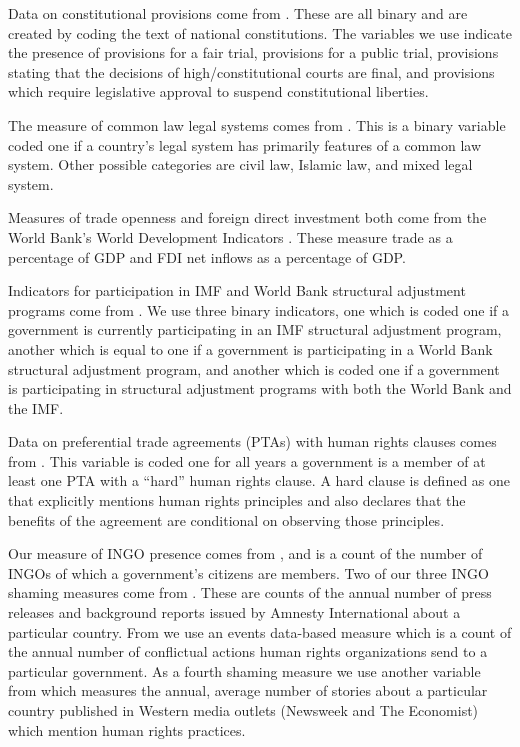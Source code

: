 \documentclass[11pt]{article}
\begin{document}
Data on constitutional provisions come from \citet{KeithTatePoe2009}. These are all binary and are created by 
coding the text of national constitutions. The variables we use indicate the presence of provisions for a fair trial, provisions for a public trial, provisions stating that the decisions of high/constitutional courts are final, and provisions which require legislative approval to suspend constitutional liberties. 

The measure of common law legal systems comes from \citet{powell2007international}. This is a binary variable coded one if a country's legal system has primarily features of a common law system. Other possible categories are civil law, Islamic law, and mixed legal system.

Measures of trade openness and foreign direct investment both come from the World Bank's World Development Indicators \citep{WorldBank2012}. These measure trade as a percentage of GDP and FDI net inflows as a percentage of GDP. 

Indicators for participation in IMF and World Bank structural adjustment programs come from \citet{AbouharbCingranelli2007}. We use three binary indicators, one which is coded one if a government is currently participating in an IMF structural adjustment program, another which is equal to one if a government is participating in a World Bank structural adjustment program, and another which is coded one if a government is participating in structural adjustment programs with both the World Bank and the IMF.

Data on preferential trade agreements (PTAs) with human rights clauses comes from \citet{SpilkerBohmelt2012}. This variable is coded one for all years a government is a member of at least one PTA with a ``hard'' human rights clause. A hard clause is defined as one that explicitly mentions human rights principles and also declares that the benefits of the agreement are conditional on observing those principles. 

Our measure of INGO presence comes from \citet{HafnerBurtonTsutsui2005}, and is a count of the number of INGOs of which a government's citizens are members. Two of our three INGO shaming measures come from \citet{RonRamosRodgers2005}. These are counts of the annual number of press releases and background reports issued by Amnesty International about a particular country. From \citet{MurdieDavis2012} we use an events data-based measure which is a count of the annual number of conflictual actions human rights organizations send to a particular government. As a fourth shaming measure we use another variable from \citet{RonRamosRodgers2005} which measures the annual, average number of stories about a particular country published in Western media outlets (Newsweek and The Economist) which mention human rights practices. 
\end{document}
